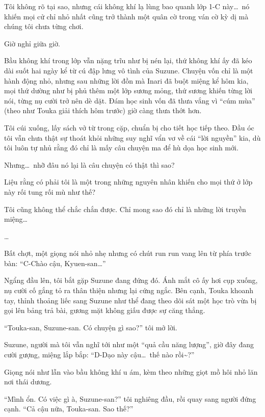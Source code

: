 \documentclass[../main.tex]{subfiles}
\begin{document}
Tôi không rõ tại sao, nhưng cái không khí lạ lùng bao quanh lớp 1-C này\dots\ nó khiến mọi cử chỉ nhỏ nhất cũng trở thành một quân cờ trong ván cờ kỳ dị mà chúng tôi chưa từng chơi.

\ct

Giờ nghỉ giữa giờ.

Bầu không khí trong lớp vẫn nặng trĩu như bị nén lại, thứ không khí ấy đã kéo dài suốt hai ngày kể từ cú đập lưng vô tình của Suzune. Chuyện vốn chỉ là một hành động nhỏ, nhưng sau những lời đồn mà Inari đã buột miệng kể hôm kia, mọi thứ dường như bị phủ thêm một lớp sương mỏng, thứ sương khiến từng lời nói, từng nụ cười trở nên dè dặt. Đám học sinh vốn đã thưa vắng vì ``cúm mùa'' (theo như Touka giải thích hôm trước) giờ càng thưa thớt hơn.

Tôi cúi xuống, lấy sách vở từ trong cặp, chuẩn bị cho tiết học tiếp theo. Đầu óc tôi vẫn chưa thật sự thoát khỏi những suy nghĩ vẩn vơ về cái ``lời nguyền'' kia, dù tôi luôn tự nhủ rằng đó chỉ là mấy câu chuyện ma để hù dọa học sinh mới.

Nhưng\dots\ nhỡ đâu nó lại là câu chuyện có thật thì sao?

Liệu rằng có phải tôi là một trong những nguyên nhân khiến cho mọi thứ ở lớp này rối tung rối mù như thế?

Tôi cũng không thể chắc chắn được. Chỉ mong sao đó chỉ là những lời truyền miệng\dots

\dots

Bất chợt, một giọng nói nhỏ nhẹ nhưng có chút run run vang lên từ phía trước bàn: ``C-Chào cậu, Kyuen-san\dots''

Ngẩng đầu lên, tôi bắt gặp Suzune đang đứng đó. Ánh mắt cô ấy hơi cụp xuống, nụ cười cố gắng tỏ ra thân thiện nhưng lại cứng ngắc. Bên cạnh, Touka khoanh tay, thỉnh thoảng liếc sang Suzune như thể đang theo dõi sát một học trò vừa bị gọi lên bảng trả bài, gương mặt không giấu được sự căng thẳng.


``Touka-san, Suzune-san. Có chuyện gì sao?'' tôi mở lời.

Suzune, người mà tôi vẫn nghĩ tới như một ``quả cầu năng lượng'', giờ đây đang cười gượng, miệng lắp bắp: ``D-Dạo này cậu\dots\ thế nào rồi\~{}?''

Giọng nói như lẫn vào bầu không khí u ám, kèm theo những giọt mồ hôi nhỏ lăn nơi thái dương.

``Mình ổn. Có việc gì à, Suzune-san?'' tôi nghiêng đầu, rồi quay sang người đứng cạnh. ``Cả cậu nữa, Touka-san. Sao thế?''
\end{document}
